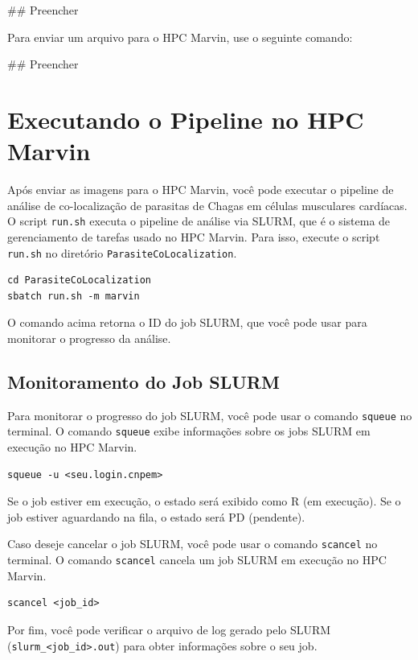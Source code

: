\documentclass{article}
\begin{document}
## Preencher

Para enviar um arquivo para o HPC Marvin, use o seguinte comando:

## Preencher

\section{Executando o Pipeline no HPC Marvin}

Após enviar as imagens para o HPC Marvin, você pode executar o pipeline de análise de co-localização de parasitas de Chagas em células musculares cardíacas. O script \texttt{run.sh} executa o pipeline de análise via SLURM, que é o sistema de gerenciamento de tarefas usado no HPC Marvin. Para isso, execute o script \texttt{run.sh} no diretório \texttt{ParasiteCoLocalization}.

\begin{verbatim}
cd ParasiteCoLocalization
sbatch run.sh -m marvin
\end{verbatim}

O comando acima retorna o ID do job SLURM, que você pode usar para monitorar o progresso da análise.

\subsection{Monitoramento do Job SLURM}

Para monitorar o progresso do job SLURM, você pode usar o comando \texttt{squeue} no terminal. O comando \texttt{squeue} exibe informações sobre os jobs SLURM em execução no HPC Marvin.

\begin{verbatim}
squeue -u <seu.login.cnpem>
\end{verbatim}

Se o job estiver em execução, o estado será exibido como R (em execução). Se o job estiver aguardando na fila, o estado será PD (pendente).

Caso deseje cancelar o job SLURM, você pode usar o comando \texttt{scancel} no terminal. O comando \texttt{scancel} cancela um job SLURM em execução no HPC Marvin.

\begin{verbatim}
scancel <job_id>
\end{verbatim}

Por fim, você pode verificar o arquivo de log gerado pelo SLURM (\texttt{slurm\_<job\_id>.out}) para obter informações sobre o seu job.
\end{document}
